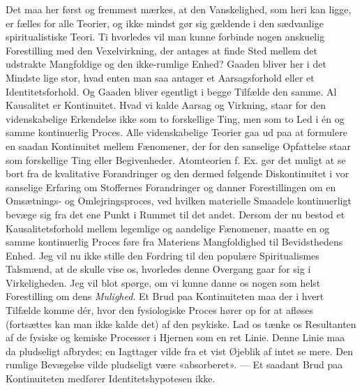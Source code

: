 \documentclass[12pt,a4paper,openany]{book}
\newcommand{\opage}[1]{\marginnote{\footnotesize\textit{[#1]}}}
\begin{document}
\setcounter{footnote}{0}%
\opage{90}Det maa her først og fremmest mærkes, at den Vanskelighed, som heri
kan ligge, er fælles for alle Teorier, og ikke mindst gør sig gældende i den
sædvanlige spiritualistiske Teori. Ti hvorledes vil man kunne forbinde nogen
anskuelig Forestilling med den Vexelvirkning, der antages at finde Sted mellem
det udstrakte Mangfoldige og den ikke-rumlige Enhed? Gaaden bliver her i det
Mindste lige stor, hvad enten man saa antager et Aarsagsforhold eller et
Identitetsforhold. Og Gaaden bliver egentligt i begge Tilfælde den samme. Al
Kausalitet er Kontinuitet. Hvad vi kalde Aarsag og Virkning, staar for den
videnskabelige Erkendelse ikke som to forskellige Ting, men som to Led i én og
samme kontinuerlig Proces. Alle videnskabelige Teorier gaa ud paa at formulere
en saadan Kontinuitet mellem Fænomener, der for den sanselige Opfattelse staar
som forskellige Ting eller Begivenheder. Atomteorien f. Ex. gør det muligt at
se bort fra de kvalitative Forandringer og den dermed følgende Diskontinuitet i
vor sanselige Erfaring om Stoffernes Forandringer og danner Forestillingen om
en Omsætnings- og Omlejringsproces, ved hvilken materielle Smaadele
kontinuerligt bevæge sig fra det ene Punkt i Rummet til det andet. Dersom der
nu bestod et Kausalitetsforhold mellem legemlige og aandelige Fænomener, maatte
en og samme kontinuerlig Proces føre fra Materiens Mangfoldighed til
Bevidsthedens Enhed. Jeg vil nu ikke stille den Fordring til den populære
Spiritualismes Talsmænd, at de skulle vise os, hvorledes denne Overgang gaar
for sig i Virkeligheden. Jeg vil blot spørge, om vi kunne danne os nogen som
helst Forestilling om dens \emph{Mulighed}. Et Brud paa Kontinuiteten maa der i
hvert Tilfælde komme dér, hvor den fysiologiske Proces hører op for at afløses
(fortsættes kan man ikke kalde det) af den psykiske. Lad os tænke os
Resultanten af de fysiske og kemiske Processer i Hjernen som en ret Linie.
Denne Linie maa da pludseligt afbrydes; en Iagttager vilde fra et vist Øjeblik
af intet se mere. Den rumlige Bevægelse vilde pludseligt være «absorberet». ---
Et saadant Brud paa Kontinuiteten medfører Identitetshypotesen ikke.
\end{document}
